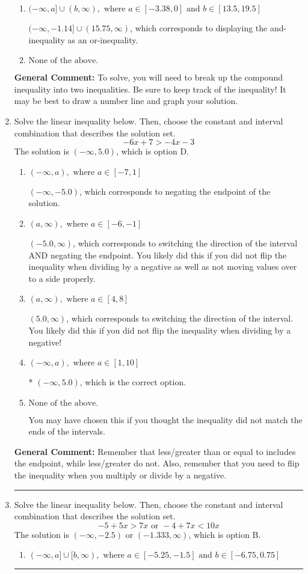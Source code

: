 \documentclass{extbook}[14pt]
\newcommand{\litem}[1]{\item #1

\rule{\textwidth}{0.4pt}}
\begin{document}
\begin{enumerate}
{\begin{enumerate}[label=\Alph*.]
$(-\infty, -1.14) \cup [15.75, \infty)$, which corresponds to displaying the and-inequality as an or-inequality AND flipping the inequality.
\item \( (-\infty, a] \cup (b, \infty), \text{ where } a \in [-3.38, 0] \text{ and } b \in [13.5, 19.5] \)

$(-\infty, -1.14] \cup (15.75, \infty)$, which corresponds to displaying the and-inequality as an or-inequality.
\item \( \text{None of the above.} \)


\end{enumerate}

\textbf{General Comment:} To solve, you will need to break up the compound inequality into two inequalities. Be sure to keep track of the inequality! It may be best to draw a number line and graph your solution.
}
\litem{
Solve the linear inequality below. Then, choose the constant and interval combination that describes the solution set.
\[ -6x + 7 > -4x -3 \]The solution is \( (-\infty, 5.0) \), which is option D.\begin{enumerate}[label=\Alph*.]
\item \( (-\infty, a), \text{ where } a \in [-7, 1] \)

 $(-\infty, -5.0)$, which corresponds to negating the endpoint of the solution.
\item \( (a, \infty), \text{ where } a \in [-6, -1] \)

 $(-5.0, \infty)$, which corresponds to switching the direction of the interval AND negating the endpoint. You likely did this if you did not flip the inequality when dividing by a negative as well as not moving values over to a side properly.
\item \( (a, \infty), \text{ where } a \in [4, 8] \)

 $(5.0, \infty)$, which corresponds to switching the direction of the interval. You likely did this if you did not flip the inequality when dividing by a negative!
\item \( (-\infty, a), \text{ where } a \in [1, 10] \)

* $(-\infty, 5.0)$, which is the correct option.
\item \( \text{None of the above}. \)

You may have chosen this if you thought the inequality did not match the ends of the intervals.
\end{enumerate}

\textbf{General Comment:} Remember that less/greater than or equal to includes the endpoint, while less/greater do not. Also, remember that you need to flip the inequality when you multiply or divide by a negative.
}
\litem{
Solve the linear inequality below. Then, choose the constant and interval combination that describes the solution set.
\[ -5 + 5 x > 7 x \text{ or } -4 + 7 x < 10 x \]The solution is \( (-\infty, -2.5) \text{ or } (-1.333, \infty) \), which is option B.\begin{enumerate}[label=\Alph*.]
\item \( (-\infty, a] \cup [b, \infty), \text{ where } a \in [-5.25, -1.5] \text{ and } b \in [-6.75, 0.75] \)


\end{enumerate}}
\end{enumerate}
\end{document}
